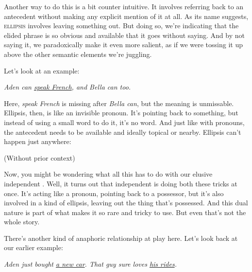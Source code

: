 Another way to do this is a bit counter intuitive. It involves referring back to an antecedent without making any explicit mention of it at all. As its name suggests, \textsc{ellipsis} involves leaving something out. But doing so, we're indicating that the elided phrase is so obvious and available that it goes without saying. And by not saying it, we paradoxically make it even more salient, as if we were tossing it up above the other semantic elements we're juggling.

Let's look at an example:

\ea \textit{Aden can \uline{speak French}, and Bella can \uline{\phantom{speak French}} too.}\\
\z

Here, \textit{speak French} is missing after \textit{Bella can}, but the meaning is unmissable. Ellipsis, then, is like an invisible pronoun. It's pointing back to something, but instead of using a small word to do it, it's no word. And just like with pronouns, the antecedent needs to be available and ideally topical or nearby. Ellipsis can't happen just anywhere:

 (Without prior context)
\z

Now, you might be wondering what all this has to do with our elusive independent . Well, it turns out that independent  is doing both these tricks at once. It's acting like a pronoun, pointing back to a possessor, but it's also involved in a kind of ellipsis, leaving out the thing that's possessed. And this dual nature is part of what makes it so rare and tricky to use. But even that's not the whole story.

\bigskip

There's another kind of anaphoric relationship at play here. Let's look back at our earlier example:

\ea \textit{Aden just bought \uline{a new car}. That guy sure loves \uline{his rides}.}\\
    \label{ex:Aden2}
\z

